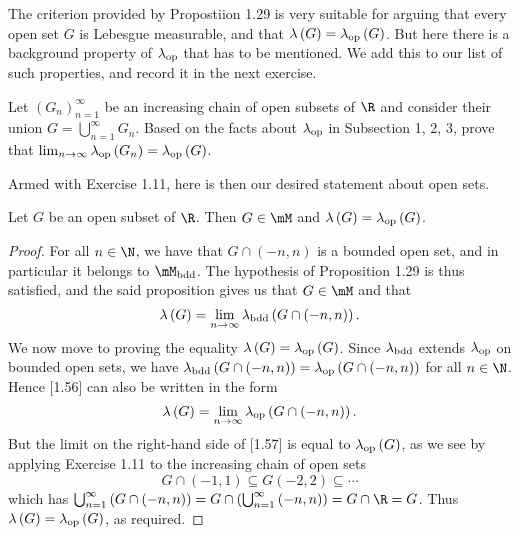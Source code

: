 \documentclass[pmath450]{subfiles}
\begin{document}
    \np The criterion provided by Propostiion 1.29 is very suitable for arguing that every open set $G$ is Lebesgue measurable, and that $\lambda\left( G \right)=\lambda_{\operatorname{op}}\left( G \right)$. But here there is a background property of $\lambda_{\operatorname{op}}$ that has to be mentioned. We add this to our list of such properties, and record it in the next exercise.

    \begin{exercise}{}
        Let $\left( G_{n} \right)^{\infty}_{n=1}$ be an increasing chain of open subsets of $\R$ and consider their union $G=\bigcup^{\infty}_{n=1}G_n$. Based on the facts about $\lambda_{\operatorname{op}}$ in Subsection 1, 2, 3, prove that $\lim_{n\to\infty}\lambda_{\operatorname{op}}\left( G_n \right)=\lambda_{\operatorname{op}}\left( G \right)$.
    \end{exercise}

    \placeqed[tl;dr]

    \np Armed with Exercise 1.11, here is then our desired statement about open sets.

    \clearpage
    \begin{prop}{}
        Let $G$ be an open subset of $\R$. Then $G\in\mM$ and $\lambda\left( G \right)=\lambda_{\operatorname{op}}\left( G \right)$.
    \end{prop}

    \begin{proof}
        For all $n\in\N$, we have that $G\cap\left( -n,n \right)$ is a bounded open set, and in particular it belongs to $\mM_{\bdd}$. The hypothesis of Proposition 1.29 is thus satisfied, and the said proposition gives us that $G\in\mM$ and that
        \begin{equation}
            \lambda\left( G \right) = \lim_{n\to\infty}\lambda_{\operatorname{bdd}}\left( G\cap\left( -n,n \right) \right).
        \end{equation}
        We now move to proving the equality $\lambda\left( G \right)=\lambda_{\operatorname{op}}\left( G \right)$. Since $\lambda_{\operatorname{bdd}}$ extends $\lambda_{\operatorname{op}}$ on bounded open sets, we have $\lambda_{\operatorname{bdd}}\left( G\cap\left( -n,n \right) \right)=\lambda_{\operatorname{op}}\left( G\cap\left( -n,n \right) \right)$ for all $n\in\N$. Hence [1.56] can also be written in the form
        \begin{equation}
            \lambda\left( G \right) = \lim_{n\to\infty}\lambda_{\operatorname{op}}\left( G\cap\left( -n,n \right) \right).
        \end{equation}
        But the limit on the right-hand side of [1.57] is equal to $\lambda_{\operatorname{op}}\left( G \right)$, as we see by applying Exercise 1.11 to the increasing chain of open sets
        \begin{equation*}
            G\cap\left( -1,1 \right)\subseteq G\left( -2,2 \right)\subseteq\cdots
        \end{equation*}
        which has $\bigcup^{\infty}_{n=1}\left( G\cap\left( -n,n \right) \right)=G\cap\left( \bigcup^{\infty}_{n=1}\left( -n,n \right) \right)=G\cap\R=G$. Thus $\lambda\left( G \right)=\lambda_{\operatorname{op}}\left( G \right)$, as required.
    \end{proof}
\end{document}
